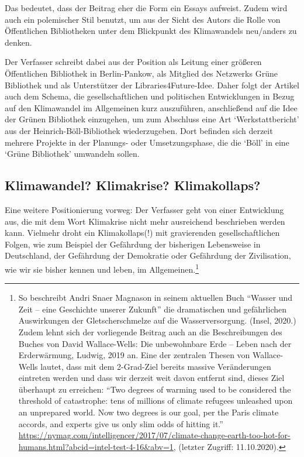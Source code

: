 \documentclass[a4paper,
fontsize=11pt,
oneside,
numbers=noperiodatend,
parskip=half-,
bibliography=totoc,
final
]{scrartcl}
\begin{document}
Das bedeutet, dass der Beitrag eher die Form ein Essays aufweist. Zudem
wird auch ein polemischer Stil benutzt, um aus der Sicht des Autors die
Rolle von Öffentlichen Bibliotheken unter dem Blickpunkt des
Klimawandels neu/anders zu denken.

Der Verfasser schreibt dabei aus der Position als Leitung einer größeren
Öffentlichen Bibliothek in Berlin-Pankow, als Mitglied des Netzwerks
Grüne Bibliothek und als Unterstützer der Libraries4Future-Idee. Daher
folgt der Artikel auch dem Schema, die gesellschaftlichen und
politischen Entwicklungen in Bezug auf den Klimawandel im Allgemeinen
kurz auszuführen, anschließend auf die Idee der Grünen Bibliothek
einzugehen, um zum Abschluss eine Art \enquote*{Werkstattbericht} aus
der Heinrich-Böll-Bibliothek wiederzugeben. Dort befinden sich derzeit
mehrere Projekte in der Planungs- oder Umsetzungsphase, die die
\enquote*{Böll} in eine \enquote*{Grüne Bibliothek} umwandeln sollen.

\hypertarget{klimawandel-klimakrise-klimakollaps}{%
\subsection{Klimawandel? Klimakrise?
Klimakollaps?}\label{klimawandel-klimakrise-klimakollaps}}

Eine weitere Positionierung vorweg: Der Verfasser geht von einer
Entwicklung aus, die mit dem Wort Klimakrise nicht mehr ausreichend
beschrieben werden kann. Vielmehr droht ein Klimakollaps(!) mit
gravierenden gesellschaftlichen Folgen, wie zum Beispiel der Gefährdung
der bisherigen Lebensweise in Deutschland, der Gefährdung der Demokratie
oder Gefährdung der Zivilisation, wie wir sie bisher kennen und leben,
im Allgemeinen.\footnote{So beschreibt Andri Snaer Magnason in seinem
  aktuellen Buch \enquote{Wasser und Zeit -- eine Geschichte unserer
  Zukunft} die dramatischen und gefährlichen Auswirkungen der
  Gletscherschmelze auf die Wasserversorgung. (Insel, 2020.) Zudem lehnt
  sich der vorliegende Beitrag auch an die Beschreibungen des Buches von
  David Wallace-Wells: Die unbewohnbare Erde -- Leben nach der
  Erderwärmung, Ludwig, 2019 an. Eine der zentralen Thesen von
  Wallace-Wells lautet, dass mit dem 2-Grad-Ziel bereits massive
  Veränderungen eintreten werden und dass wir derzeit weit davon
  entfernt sind, dieses Ziel überhaupt zu erreichen: \enquote{Two
  degrees of warming used to be considered the threshold of catastrophe:
  tens of millions of climate refugees unleashed upon an unprepared
  world. Now two degrees is our goal, per the Paris climate accords, and
  experts give us only slim odds of hitting it.}
  \url{https://nymag.com/intelligencer/2017/07/climate-change-earth-too-hot-for-humans.html?abcid=intel-test-4-16\&abv=1},
  (letzter Zugriff: 11.10.2020).}
\end{document}
